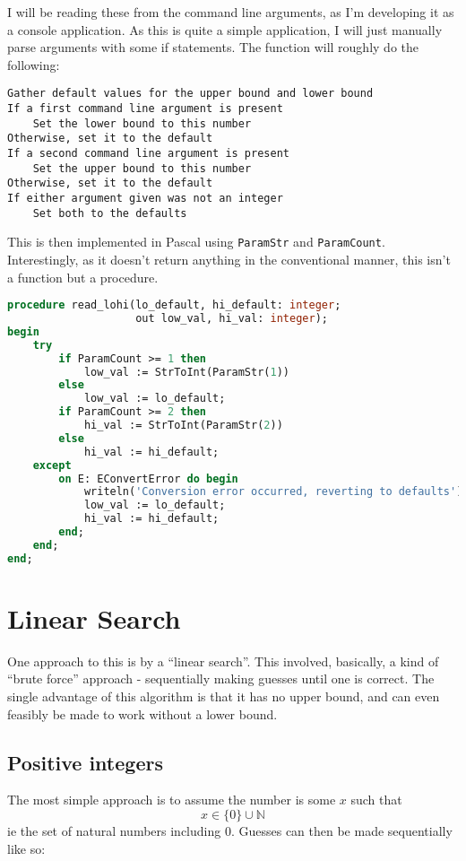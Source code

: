 \documentclass{article}
\begin{document}
    I will be reading these from the command line arguments, as I'm developing
    it as a console application. As this is quite a simple application, I will
    just manually parse arguments with some if statements. The function will
    roughly do the following:

\begin{lstlisting}[caption=read\_lohi pseudocode]
Gather default values for the upper bound and lower bound
If a first command line argument is present
    Set the lower bound to this number
Otherwise, set it to the default
If a second command line argument is present
    Set the upper bound to this number
Otherwise, set it to the default
If either argument given was not an integer
    Set both to the defaults
\end{lstlisting}

    This is then implemented in Pascal using \verb|ParamStr| and
    \verb|ParamCount|. Interestingly, as it doesn't return anything in the
    conventional manner, this isn't a function but a procedure.

\begin{lstlisting}[language=Pascal, caption=read\_lohi implementation]
procedure read_lohi(lo_default, hi_default: integer;
                    out low_val, hi_val: integer);
begin
    try
        if ParamCount >= 1 then
            low_val := StrToInt(ParamStr(1))
        else
            low_val := lo_default;
        if ParamCount >= 2 then
            hi_val := StrToInt(ParamStr(2))
        else
            hi_val := hi_default;
    except
        on E: EConvertError do begin
            writeln('Conversion error occurred, reverting to defaults');
            low_val := lo_default;
            hi_val := hi_default;
        end;
    end;
end;
\end{lstlisting}

    \section{Linear Search}
    One approach to this is by a ``linear search''. This involved, basically, a
    kind of ``brute force'' approach - sequentially making guesses until one is
    correct. The single advantage of this algorithm is that it has no upper
    bound, and can even feasibly be made to work without a lower bound.
    
    \subsection{Positive integers}
    The most simple approach is to assume the number is some $x$ such that
    \begin{equation}
        x \in \{0\} \cup \mathbb{N}
    \end{equation}
    ie the set of natural numbers including 0. Guesses can then be made
    sequentially like so:
\end{document}

